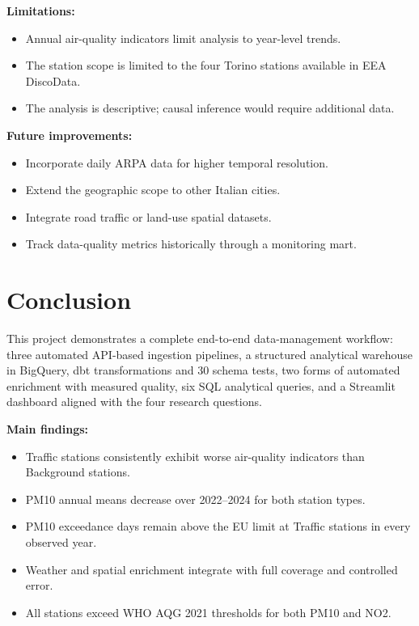 \documentclass[11pt,a4paper]{article}
\begin{document}
\begin{tcolorbox}[infobox]
\textbf{Limitations:}
\begin{itemize}
  \item Annual air-quality indicators limit analysis to year-level trends.
  \item The station scope is limited to the four Torino stations available in EEA DiscoData.
  \item The analysis is descriptive; causal inference would require additional data.
\end{itemize}
\textbf{Future improvements:}
\begin{itemize}
  \item Incorporate daily ARPA data for higher temporal resolution.
  \item Extend the geographic scope to other Italian cities.
  \item Integrate road traffic or land-use spatial datasets.
  \item Track data-quality metrics historically through a monitoring mart.
\end{itemize}
\end{tcolorbox}

\section{Conclusion}

This project demonstrates a complete end-to-end data-management workflow: three automated
API-based ingestion pipelines, a structured analytical warehouse in BigQuery, dbt transformations
and 30 schema tests, two forms of automated enrichment with measured quality, six SQL analytical
queries, and a Streamlit dashboard aligned with the four research questions.

\textbf{Main findings:}
\begin{itemize}
  \item Traffic stations consistently exhibit worse air-quality indicators than Background stations.
  \item PM10 annual means decrease over 2022--2024 for both station types.
  \item PM10 exceedance days remain above the EU limit at Traffic stations in every observed year.
  \item Weather and spatial enrichment integrate with full coverage and controlled error.
  \item All stations exceed WHO AQG 2021 thresholds for both PM10 and NO2.
\end{itemize}
\end{document}
